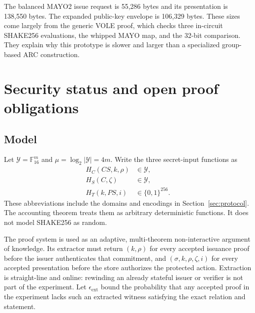 \documentclass[11pt]{article}
\newcommand{\F}{\mathbb{F}_{16}}
\theoremstyle{remark}
\begin{document}
\begin{minipage}{\textwidth}
The balanced MAYO2 issue request is 55,286 bytes and its presentation is
138,550 bytes. The expanded public-key envelope is 106,329 bytes. These sizes
come largely from the generic VOLE proof, which checks three in-circuit
SHAKE256 evaluations, the whipped MAYO map, and the 32-bit comparison. They
explain why this prototype is slower and larger than a specialized
group-based ARC construction.
\end{minipage}

\section{Security status and open proof obligations}
\label{sec:security}

\subsection{Model}

Let $\mathcal{Y}=\F^m$ and $\mu=\log_2|\mathcal{Y}|=4m$. Write the three
secret-input functions as
\begin{align*}
 H_C(CS,k,\rho) &\in \mathcal{Y},\\
 H_S(C,\zeta) &\in \mathcal{Y},\\
 H_T(k,PS,i) &\in {\{0,1\}}^{256}.
\end{align*}
These abbreviations include the domains and encodings in
Section~\ref{sec:protocol}. The accounting theorem treats them as arbitrary
deterministic functions. It does not model SHAKE256 as random.

The proof system is used as an adaptive, multi-theorem non-interactive
argument of knowledge. Its extractor must return $(k,\rho)$ for every
accepted issuance proof before the issuer authenticates that commitment, and
$(\sigma,k,\rho,\zeta,i)$ for every accepted presentation before the store
authorizes the protected action. Extraction is straight-line and online:
rewinding an already stateful issuer or verifier is not part of the
experiment. Let $\epsilon_{\mathrm{ext}}$ bound the probability that any
accepted proof in the experiment lacks such an extracted witness satisfying
the exact relation and statement.
\end{document}
